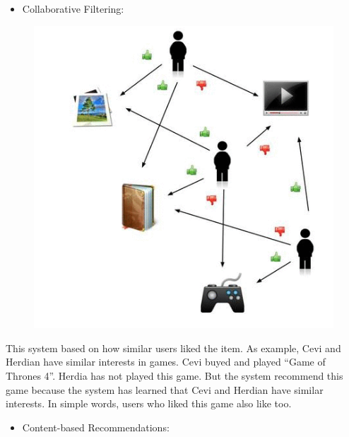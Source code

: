 \documentclass[]{book}
\providecommand{\tightlist}{%
  \setlength{\itemsep}{0pt}\setlength{\parskip}{0pt}}
\begin{document}
\begin{itemize}
\tightlist
\item
  Collaborative Filtering:
\end{itemize}

\begin{figure}
\centering
\includegraphics{A.PNG}
\caption{}
\end{figure}

This system based on how similar users liked the item. As example, Cevi
and Herdian have similar interests in games. Cevi buyed and played
``Game of Thrones 4''. Herdia has not played this game. But the system
recommend this game because the system has learned that Cevi and Herdian
have similar interests. In simple words, users who liked this game also
like too.

\begin{itemize}
\tightlist
\item
  Content-based Recommendations:
\end{itemize}
\end{document}
